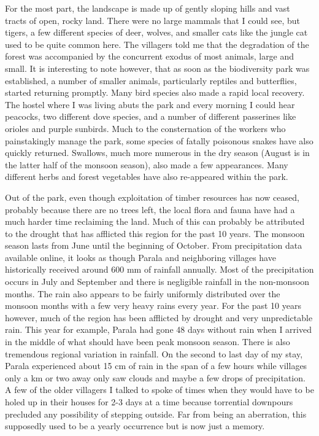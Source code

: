 \documentclass{article}
\begin{document}
For the most part, the landscape is made up of gently sloping hills and vast tracts of open, rocky land. There were no large mammals that I could see, but tigers, a few different species of deer, wolves, and smaller cats like the jungle cat used to be quite common here. The villagers told me that the degradation of the forest was accompanied by the concurrent exodus of most animals, large and small. It is interesting to note however, that as soon as the biodiversity park was established, a number of smaller animals, particularly reptiles and butterflies, started returning promptly. Many bird species also made a rapid local recovery. The hostel where I was living abuts the park and every morning I could hear peacocks, two different dove species, and a number of different passerines like orioles and purple sunbirds. Much to the consternation of the workers who painstakingly manage the park, some species of fatally poisonous snakes have also quickly returned. Swallows, much more numerous in the dry season (August is in the latter half of the monsoon season), also made a few appearances. Many different herbs and forest vegetables have also re-appeared within the park.

Out of the park, even though exploitation of timber resources has now ceased, probably because there are no trees left, the local flora and fauna have had a much harder time reclaiming the land. Much of this can probably be attributed to the drought that has afflicted this region for the past 10 years. The monsoon season lasts from June until the beginning of October. From precipitation data available online, it looks as though Parala and neighboring villages have historically received around 600 mm of rainfall annually. Most of the precipitation occurs in July and September and there is negligible rainfall in the non-monsoon months. The rain also appears to be fairly uniformly distributed over the monsoon months with a few very heavy rains every year. For the past 10 years however, much of the region has been afflicted by drought and very unpredictable rain. This year for example, Parala had gone 48 days without rain when I arrived in the middle of what should have been peak monsoon season. There is also tremendous regional variation in rainfall. On the second to last day of my stay, Parala experienced about 15 cm of rain in the span of a few hours while villages only a km or two away only saw clouds and maybe a few drops of precipitation. A few of the older villagers I talked to spoke of times when they would have to be holed up in their houses for 2-3 days at a time because torrential downpours precluded any possibility of stepping outside. Far from being an aberration, this supposedly used to be a yearly occurrence but is now just a memory.
\end{document}
